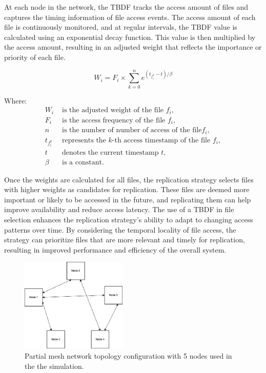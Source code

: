 \documentclass[10pt, conference]{IEEEtran}
\begin{document}
At each node in the network, the TBDF tracks the access amount of files and captures the timing information of file access events. The access amount of each file is continuously monitored, and at regular intervals, the TBDF value is calculated using an exponential decay function. This value is then multiplied by the access amount, resulting in an adjusted weight that reflects the importance or priority of each file.

\begin{equation}
W_{i} = F_{i} \times \sum_{k=0}^n e^{(t_{f_i^k}-t)/\beta}
\end{equation}

Where:
\begin{align*}
W_{i} &\text{ is the adjusted weight of the file } f_{i}, \\
F_{i} &\text{ is the access frequency of the file } f_{i}, \\
n &\text{ is the number of number of access of the file} f_{i}, \\
t_{f_i^k} &\text{ represents the } k\text{-th access timestamp of the file } f_{i}, \\
t &\text{ denotes the current timestamp } t, \\
\beta &\text{ is a constant.}
\end{align*}

Once the weights are calculated for all files, the replication strategy selects files with higher weights as candidates for replication. These files are deemed more important or likely to be accessed in the future, and replicating them can help improve availability and reduce access latency. The use of a TBDF in file selection enhances the replication strategy's ability to adapt to changing access patterns over time. By considering the temporal locality of file access, the strategy can prioritize files that are more relevant and timely for replication, resulting in improved performance and efficiency of the overall system.



\begin{center}
\begin{figure}[htbp]
  \includegraphics[width=0.45\textwidth]
  {project/fig/topology.png}
  \caption{Partial mesh network topology configuration with 5 nodes used in the the simulation.}
  \label{fig:topology}
\end{figure}
\end{center}
\end{document}
